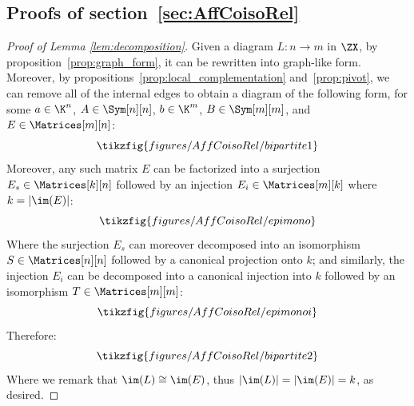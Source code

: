 \subsection{Proofs of section~\ref{sec:AffCoisoRel}}
\begin{proof}[Proof of Lemma \ref{lem:decomposition}]
  Given a diagram \(L:n\to m\) in \(\ZX\), by proposition~\ref{prop:graph_form}, it can be rewritten into graph-like form.  Moreover, by propositions~\ref{prop:local_complementation} and~\ref{prop:pivot}, we can remove all of the internal edges to obtain a diagram of the following form, for some  \(a\in\K^n\), \(A \in \Sym[n][n]\), \(b\in\K^m\), \(B \in \Sym[m][m]\), and \(E \in \Matrices[m][n]\):
  \begin{equation}
    \tikzfig{figures/AffCoisoRel/bipartite1}
  \end{equation}
  Moreover, any such matrix \(E\) can be factorized into a surjection \(E_s\in \Matrices[k][n]\) followed by an injection \(E_i\in\Matrices[m][k]\) where \(k=|\im (E) |\):
  \begin{equation}
    \tikzfig{figures/AffCoisoRel/epimono}
  \end{equation}
  Where the surjection \(E_s\) can moreover decomposed into an isomorphism \(S\in\Matrices[n][n]\) followed by a canonical projection onto \(k\); and similarly, the injection \(E_i\) can be decomposed into a canonical injection into   \(k\) followed by an isomorphism  \(T\in\Matrices[m][m]\):
  \begin{equation}
    \tikzfig{figures/AffCoisoRel/epimonoi}
  \end{equation}
  Therefore:
  \begin{equation}
    \tikzfig{figures/AffCoisoRel/bipartite2}
  \end{equation}
  Where we remark that \(\im(L)\cong \im(E)\), thus \(|\im(L)|= |\im(E)|=k\), as desired.
\end{proof}
